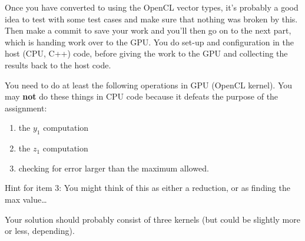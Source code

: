 \documentclass[letterpaper,10pt]{article}
\begin{document}
Once you have converted to using the OpenCL vector types, it's probably a good idea 
to test with some test cases and make sure that nothing was broken by this. Then make 
a commit to save your work and you'll then go on to the next part, which is handing 
work over to the GPU. You do set-up and configuration in the host (CPU, C++) code, before giving the work to the GPU and collecting the results back to the host code.

You need to do at least the following operations in GPU (OpenCL kernel). You may \textbf{ not } do these things in CPU code because it defeats the purpose of the assignment: 

\begin{enumerate}
\item the $y_{1}$ computation
\item the $z_{1}$ computation
\item checking for error larger than the maximum allowed.
\end{enumerate} 

Hint for item 3:  You might think of this as either a reduction, or as finding the max value\ldots

Your solution should probably consist of three kernels (but could be slightly more or less, depending).
\end{document}
